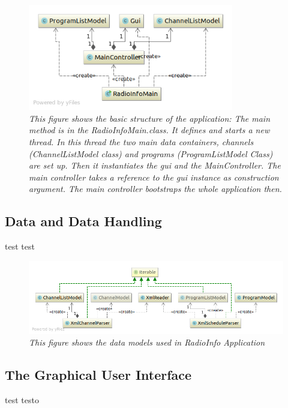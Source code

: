 \documentclass[a4paper,11pt,twoside]{article}
\begin{document}
\begin{figure}[ht!]
  \centering
  \includegraphics[width=0.8\textwidth]{basicUML.png}
  \caption{\textit{This figure shows the basic structure of the application: The main method is in the RadioInfoMain.class. It defines and starts a new thread. In this thread the two main data containers, channels (ChannelListModel class) and programs (ProgramListModel Class) are set up. Then it instantiates the gui and the MainController. The main controller takes a reference to the gui instance as construction argument. The main controller bootstraps the whole application then.}}
  \label{fig:basic}
  \end{figure}


\subsection{Data and Data Handling}

test test
\begin{figure}[p]
  \centering
  \includegraphics[width=1\textwidth]{dataModelsUML.png}
  \caption{\textit{This figure shows the data models used in RadioInfo Application}}
  \label{fig:dataModels}
\end{figure}


\subsection{The Graphical User Interface}
test testo
\end{document}
